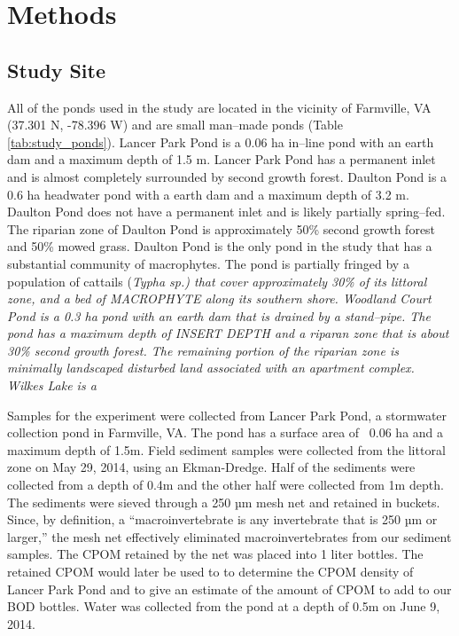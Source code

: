 \section{Methods}
\subsection{Study Site}
All of the ponds used in the study are located in the vicinity of Farmville, VA (37.301 N, -78.396 W) and are small man--made ponds (Table \ref{tab:study_ponds}).  Lancer Park Pond is a 0.06 ha in--line pond with an earth dam and a maximum depth of 1.5 m. Lancer Park Pond has a permanent inlet and is almost completely surrounded by second growth forest. Daulton Pond is a 0.6 ha headwater pond with a earth dam and a maximum depth of 3.2 m. Daulton Pond does not have a permanent inlet and is likely partially spring--fed. The riparian zone of Daulton Pond is approximately 50\% second growth forest and 50\% mowed grass. Daulton Pond is the only pond in the study that has a substantial community of macrophytes. The pond is partially fringed by a population of cattails (\em{Typha sp.}) 
that cover approximately 30\% of its littoral zone, and a bed of MACROPHYTE along its southern shore. Woodland Court Pond is a 0.3 ha pond with an earth dam that is drained by a stand--pipe. The pond has a maximum depth of INSERT DEPTH and a riparan zone that is about 30\% second growth forest. The remaining portion of the riparian zone is minimally landscaped disturbed land associated with an apartment complex. Wilkes Lake is a 


Samples for the experiment were collected from Lancer Park Pond, a stormwater collection pond in Farmville, VA. The pond has a surface area of ~0.06 ha and a maximum depth of 1.5m. Field sediment samples were collected from the littoral zone on May 29, 2014, using an Ekman-Dredge. Half of the sediments were collected from a depth of 0.4m and the other half were collected from 1m depth. The sediments were sieved through a 250 µm mesh net and retained in buckets. Since, by definition, a “macroinvertebrate is any invertebrate that is 250 µm or larger,” the mesh net effectively eliminated macroinvertebrates from our sediment samples. The CPOM retained by the net was placed into 1 liter bottles. The retained CPOM would later be used to to determine the CPOM density of Lancer Park Pond and to give an estimate of the amount of CPOM to add to our BOD bottles. Water was collected from the pond at a depth of 0.5m on June 9, 2014.
    
